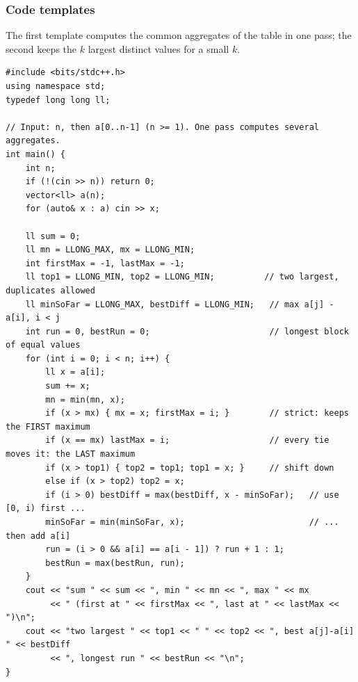 \subsubsection*{Code templates}

The first template computes the common aggregates of the table in one pass; the second keeps the $k$ largest distinct values for a small $k$.

\begin{lstlisting}[style=cpp]
#include <bits/stdc++.h>
using namespace std;
typedef long long ll;

// Input: n, then a[0..n-1] (n >= 1). One pass computes several aggregates.
int main() {
    int n;
    if (!(cin >> n)) return 0;
    vector<ll> a(n);
    for (auto& x : a) cin >> x;

    ll sum = 0;
    ll mn = LLONG_MAX, mx = LLONG_MIN;
    int firstMax = -1, lastMax = -1;
    ll top1 = LLONG_MIN, top2 = LLONG_MIN;          // two largest, duplicates allowed
    ll minSoFar = LLONG_MAX, bestDiff = LLONG_MIN;   // max a[j] - a[i], i < j
    int run = 0, bestRun = 0;                        // longest block of equal values
    for (int i = 0; i < n; i++) {
        ll x = a[i];
        sum += x;
        mn = min(mn, x);
        if (x > mx) { mx = x; firstMax = i; }        // strict: keeps the FIRST maximum
        if (x == mx) lastMax = i;                    // every tie moves it: the LAST maximum
        if (x > top1) { top2 = top1; top1 = x; }     // shift down
        else if (x > top2) top2 = x;
        if (i > 0) bestDiff = max(bestDiff, x - minSoFar);   // use [0, i) first ...
        minSoFar = min(minSoFar, x);                         // ... then add a[i]
        run = (i > 0 && a[i] == a[i - 1]) ? run + 1 : 1;
        bestRun = max(bestRun, run);
    }
    cout << "sum " << sum << ", min " << mn << ", max " << mx
         << " (first at " << firstMax << ", last at " << lastMax << ")\n";
    cout << "two largest " << top1 << " " << top2 << ", best a[j]-a[i] " << bestDiff
         << ", longest run " << bestRun << "\n";
}
\end{lstlisting}


